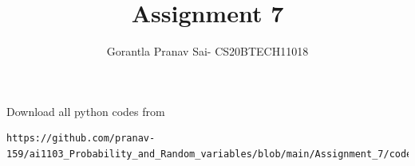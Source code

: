 \documentclass[journal,12pt,twocolumn]{IEEEtran}
\DeclareMathOperator*{\Res}{Res}
\begin{document}
\newcommand{\BEQA}{\begin{eqnarray}}
\newcommand{\EEQA}{\end{eqnarray}}
\newcommand{\define}{\stackrel{\triangle}{=}}

\raggedbottom
\setlength{\parindent}{0pt}
\providecommand{\mbf}{\mathbf}
\providecommand{\pr}[1]{\ensuremath{\Pr\left(#1\right)}}
\providecommand{\qfunc}[1]{\ensuremath{Q\left(#1\right)}}
\providecommand{\sbrak}[1]{\ensuremath{{}\left[#1\right]}}
\providecommand{\lsbrak}[1]{\ensuremath{{}\left[#1\right.}}
\providecommand{\rsbrak}[1]{\ensuremath{{}\left.#1\right]}}
\providecommand{\brak}[1]{\ensuremath{\left(#1\right)}}
\providecommand{\lbrak}[1]{\ensuremath{\left(#1\right.}}
\providecommand{\rbrak}[1]{\ensuremath{\left.#1\right)}}
\providecommand{\cbrak}[1]{\ensuremath{\left\{#1\right\}}}
\providecommand{\lcbrak}[1]{\ensuremath{\left\{#1\right.}}
\providecommand{\rcbrak}[1]{\ensuremath{\left.#1\right\}}}
\theoremstyle{remark}
\newtheorem{rem}{Remark}
\newcommand{\sgn}{\mathop{\mathrm{sgn}}}
\providecommand{\abs}[1]{\vert#1\vert}
\providecommand{\res}[1]{\Res\displaylimits_{#1}} 
\providecommand{\norm}[1]{\lVert#1\rVert}
\providecommand{\mtx}[1]{\mathbf{#1}}
\providecommand{\mean}[1]{E[ #1 ]}
\providecommand{\fourier}{\overset{\mathcal{F}}{ \rightleftharpoons}}
\providecommand{\system}{\overset{\mathcal{H}}{ \longleftrightarrow}}
\newcommand{\solution}{\noindent \textbf{Solution: }}
\newcommand{\cosec}{\,\text{cosec}\,}
\providecommand{\dec}[2]{\ensuremath{\overset{#1}{\underset{#2}{\gtrless}}}}
\newcommand{\myvec}[1]{\ensuremath{\begin{pmatrix}#1\end{pmatrix}}}
\newcommand{\mydet}[1]{\ensuremath{\begin{vmatrix}#1\end{vmatrix}}}
\makeatletter
{}
\makeatother
\let\StandardTheFigure\thefigure
\let\vec\mathbf
\renewcommand{\thefigure}{\theproblem}
\def\putbox#1#2#3{\makebox[0in][l]{\makebox[#1][l]{}\raisebox{\baselineskip}[0in][0in]{\raisebox{#2}[0in][0in]{#3}}}}
     \def\rightbox#1{\makebox[0in][r]{#1}}
     \def\centbox#1{\makebox[0in]{#1}}
     \def\topbox#1{\raisebox{-\baselineskip}[0in][0in]{#1}}
     \def\midbox#1{\raisebox{-0.5\baselineskip}[0in][0in]{#1}}
\vspace{3cm}
\title{Assignment 7}
\author{Gorantla Pranav Sai- CS20BTECH11018}
\maketitle
\newpage
\bigskip
\renewcommand{\thefigure}{\theenumi}
\renewcommand{\thetable}{\theenumi}
Download all python codes from 
\begin{lstlisting}
https://github.com/pranav-159/ai1103_Probability_and_Random_variables/blob/main/Assignment_7/codes/experimental_verification_Assignment7.py
\end{lstlisting}
\end{document}
